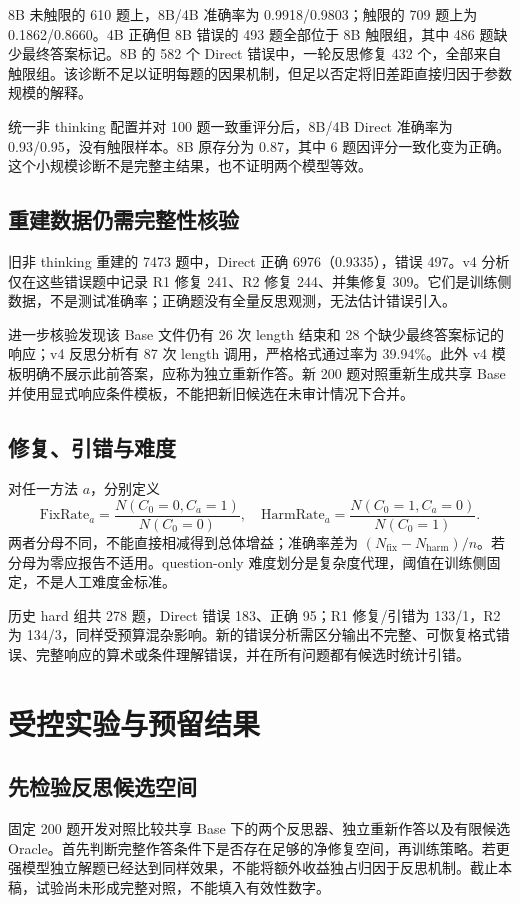 \documentclass[11pt]{article}
\begin{document}
8B 未触限的 610 题上，8B/4B 准确率为 0.9918/0.9803；触限的 709 题上为 0.1862/0.8660。4B 正确但 8B 错误的 493 题全部位于 8B 触限组，其中 486 题缺少最终答案标记。8B 的 582 个 Direct 错误中，一轮反思修复 432 个，全部来自触限组。该诊断不足以证明每题的因果机制，但足以否定将旧差距直接归因于参数规模的解释。

统一非 thinking 配置并对 100 题一致重评分后，8B/4B Direct 准确率为 0.93/0.95，没有触限样本。8B 原存分为 0.87，其中 6 题因评分一致化变为正确。这个小规模诊断不是完整主结果，也不证明两个模型等效。

\subsection{重建数据仍需完整性核验}
旧非 thinking 重建的 7473 题中，Direct 正确 6976（0.9335），错误 497。v4 分析仅在这些错误题中记录 R1 修复 241、R2 修复 244、并集修复 309。它们是训练侧数据，不是测试准确率；正确题没有全量反思观测，无法估计错误引入。

进一步核验发现该 Base 文件仍有 26 次 length 结束和 28 个缺少最终答案标记的响应；v4 反思分析有 87 次 length 调用，严格格式通过率为 39.94\%。此外 v4 模板明确不展示此前答案，应称为独立重新作答。新 200 题对照重新生成共享 Base 并使用显式响应条件模板，不能把新旧候选在未审计情况下合并。

\subsection{修复、引错与难度}
对任一方法 $a$，分别定义
\begin{equation}
\mathrm{FixRate}_a=\frac{N(C_0=0,C_a=1)}{N(C_0=0)},\quad
\mathrm{HarmRate}_a=\frac{N(C_0=1,C_a=0)}{N(C_0=1)}.
\end{equation}
两者分母不同，不能直接相减得到总体增益；准确率差为 $(N_{\mathrm{fix}}-N_{\mathrm{harm}})/n$。若分母为零应报告不适用。question-only 难度划分是复杂度代理，阈值在训练侧固定，不是人工难度金标准。

历史 hard 组共 278 题，Direct 错误 183、正确 95；R1 修复/引错为 133/1，R2 为 134/3，同样受预算混杂影响。新的错误分析需区分输出不完整、可恢复格式错误、完整响应的算术或条件理解错误，并在所有问题都有候选时统计引错。

\section{受控实验与预留结果}
\subsection{先检验反思候选空间}
固定 200 题开发对照比较共享 Base 下的两个反思器、独立重新作答以及有限候选 Oracle。首先判断完整作答条件下是否存在足够的净修复空间，再训练策略。若更强模型独立解题已经达到同样效果，不能将额外收益独占归因于反思机制。截止本稿，试验尚未形成完整对照，不能填入有效性数字。
\end{document}
